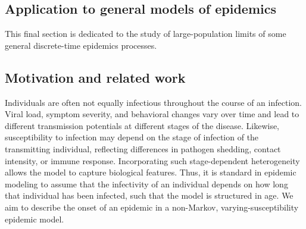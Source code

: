 \begin{refsegment}
\section{Application to general models of epidemics}\label{ch2_sec:applications}


This final section is dedicated to the study of large-population
limits of some general discrete-time epidemics processes.

\subsection*{Motivation and related work}
Individuals are often not equally infectious throughout the course of
an infection. Viral load, symptom severity, and behavioral changes
vary over time and lead to different transmission potentials at
different stages of the disease. Likewise, susceptibility to infection
may depend on the stage of infection of the transmitting individual,
reflecting differences in pathogen shedding, contact intensity, or
immune response. Incorporating such stage-dependent heterogeneity
allows the model to capture biological features. Thus, it is standard
in epidemic modeling to assume that the infectivity of an individual
depends on how long that individual has been infected, such that the
model is structured in age. We aim to describe the onset of an
epidemic in a non-Markov, varying-susceptibility epidemic model.
 

\end{refsegment}
